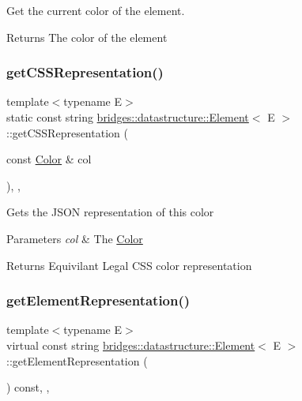 Get the current color of the element. 

\begin{DoxyReturn}{Returns}
The color of the element 
\end{DoxyReturn}
\mbox{\label{classbridges_1_1datastructure_1_1_element_afc6de63b836064024721d72b7ffa52bf}} 
\subsubsection{\texorpdfstring{getCSSRepresentation()}{getCSSRepresentation()}}
{\footnotesize\ttfamily template$<$typename E$>$ \\
static const string \mbox{\hyperlink{classbridges_1_1datastructure_1_1_element}{bridges\+::datastructure\+::\+Element}}$<$ E $>$\+::get\+C\+S\+S\+Representation (\begin{DoxyParamCaption}\item[{const \mbox{\hyperlink{classbridges_1_1datastructure_1_1_color}{Color}} \&}]{col }\end{DoxyParamCaption})\hspace{0.3cm}{\ttfamily [inline]}, {\ttfamily [static]}, {\ttfamily [protected]}}

Gets the J\+S\+ON representation of this color


\begin{DoxyParams}{Parameters}
{\em col} & The \mbox{\hyperlink{classbridges_1_1datastructure_1_1_color}{Color}} \\
\hline
\end{DoxyParams}
\begin{DoxyReturn}{Returns}
Equivilant Legal C\+SS color representation 
\end{DoxyReturn}
\mbox{\label{classbridges_1_1datastructure_1_1_element_a285fc51d6dfcb8bff2d72f7e4addfe6d}} 
\subsubsection{\texorpdfstring{getElementRepresentation()}{getElementRepresentation()}}
{\footnotesize\ttfamily template$<$typename E$>$ \\
virtual const string \mbox{\hyperlink{classbridges_1_1datastructure_1_1_element}{bridges\+::datastructure\+::\+Element}}$<$ E $>$\+::get\+Element\+Representation (\begin{DoxyParamCaption}{ }\end{DoxyParamCaption}) const\hspace{0.3cm}{\ttfamily [inline]}, {\ttfamily [protected]}, {\ttfamily [virtual]}}


